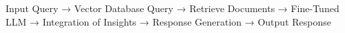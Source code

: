 Input Query → Vector Database Query → Retrieve Documents → Fine-Tuned LLM → Integration of Insights → Response Generation → Output Response
